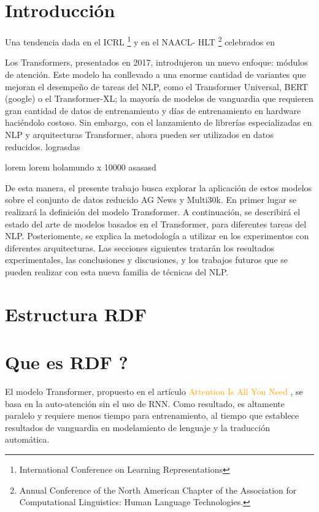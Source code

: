 \documentclass[conference]{IEEEtran}
\begin{document}
\section{Introducci\'on}
Una tendencia dada en el ICRL \footnote{International Conference on Learning Representations } y en el NAACL- HLT \footnote{Annual Conference of the North American Chapter of the Association for Computational Linguistics: Human Language Technologies.} celebrados en 

\vspace{0.2cm}

Los Transformers, presentados en 2017, introdujeron un nuevo enfoque: m\'odulos de atenci\'on. Este modelo ha conllevado a una enorme cantidad de variantes que mejoran el desempe\~no de tareas del NLP, como el Transformer Universal, BERT (google) o el Transformer-XL; la mayor\'ia de modelos de vanguardia que requieren gran cantidad de datos de entrenamiento y d\'ias de entrenamiento en hardware haci\'endolo costoso. Sin embargo, con el lanzamiento de librer\'ias especializadas en NLP y arquitecturas Transformer, ahora pueden ser utilizados en datos reducidos.
lograsdas

lorem
lorem
holamundo x 10000 
asasasd


\vspace{0.2cm}

De esta manera, el presente trabajo busca explorar la aplicación de estos modelos sobre el conjunto de datos reducido AG News y Multi30k. En primer lugar se realizar\'a la definici\'on del modelo Transformer. A continuaci\'on, se describir\'a el estado del arte de modelos basados en el Transformer, para diferentes tareas del NLP. Posteriomente, se explica la metodolog\'ia a utilizar en los experimentos con diferentes arquitecturas. Las secciones siguientes tratar\'an los resultados experimentales, las conclusiones y discusiones, y los trabajos futuros que se pueden realizar con esta nueva familia de t\'ecnicas del NLP.


\vspace{0.2cm}

\section{Estructura RDF}

\section{Que es RDF ?}


El modelo Transformer, propuesto en el art\'iculo \textcolor{orange}{Attention Is All You Need} \cite{b1}, se basa en la auto-atenci\'on sin el uso de RNN. Como resultado, es altamente paralelo y requiere menos tiempo para entrenamiento, al tiempo que establece resultados de vanguardia en modelamiento de lenguaje y la traducci\'on autom\'atica.
\end{document}
